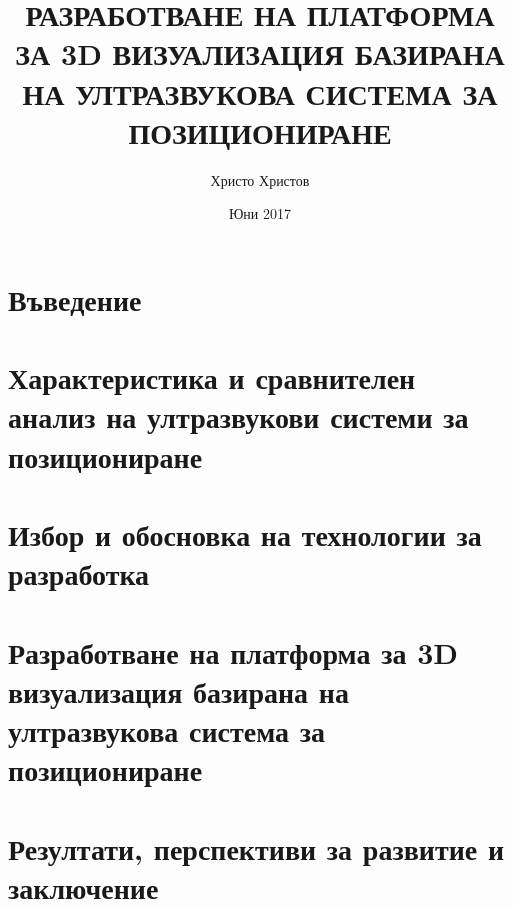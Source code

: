 \documentclass{article}
\title{РАЗРАБОТВАНЕ НА ПЛАТФОРМА ЗА 3D ВИЗУАЛИЗАЦИЯ БАЗИРАНА НА УЛТРАЗВУКОВА СИСТЕМА ЗА ПОЗИЦИОНИРАНЕ}
\author{Христо Христов}
\date{Юни 2017}
\begin{document}
\maketitle

\tableofcontents

\section{Въведение}






\section{Характеристика и сравнителен анализ на ултразвукови системи за позициониране}

\section{Избор и обосновка на технологии за разработка}

\section{Разработване на платформа за 3D визуализация базирана на ултразвукова система за позициониране}

\section{Резултати, перспективи за развитие и заключение}
\end{document}
